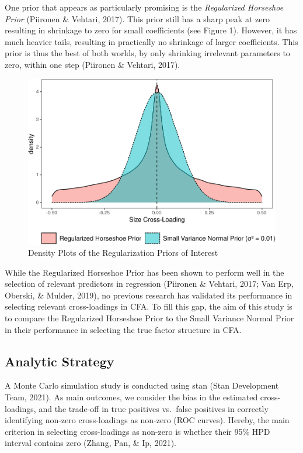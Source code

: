 \documentclass[
  english,
  man]{apa6}
\begin{document}
One prior that appears as particularly promising is the \emph{Regularized Horseshoe Prior}
(Piironen \& Vehtari, 2017). This prior still has a sharp peak at zero resulting in shrinkage to zero for small coefficients (see Figure 1). However, it has much heavier tails, resulting in practically no shrinkage of larger coefficients. This prior is thus the best of both worlds, by only shrinking irrelevant parameters to zero, within one step (Piironen \& Vehtari, 2017).

\begin{figure}
\centering
\includegraphics{JMBKoch_Proposal_files/figure-latex/unnamed-chunk-1-1.pdf}
\caption{\label{fig:unnamed-chunk-1}Density Plots of the Regularization Priors of Interest}
\end{figure}

While the Regularized Horseshoe Prior has been shown to perform well in
the selection of relevant predictors in regression
(Piironen \& Vehtari, 2017; Van Erp, Oberski, \& Mulder, 2019), no previous research
has validated its performance in selecting relevant cross-loadings in
CFA. To fill this gap, the aim of this study is to compare the
Regularized Horseshoe Prior to the Small Variance Normal Prior in their
performance in selecting the true factor structure in CFA.

\hypertarget{analytic-strategy}{%
\subsection{Analytic Strategy}\label{analytic-strategy}}

A Monte Carlo simulation study is conducted using stan
(Stan Development Team, 2021). As main outcomes, we consider the bias in the estimated cross-loadings, and the trade-off in true positives vs.~false positives in correctly identifying non-zero cross-loadings as non-zero (ROC curves). Hereby, the main criterion in selecting cross-loadings as non-zero is whether their 95\% HPD interval contains zero (Zhang, Pan, \& Ip, 2021).
\end{document}

